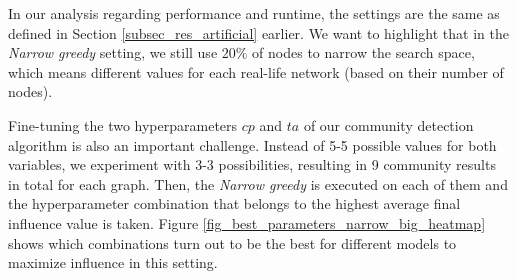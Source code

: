 \documentclass[pdflatex,sn-mathphys-num]{sn-jnl}
\begin{document}
In our analysis regarding performance and runtime, the settings are the same as defined in Section \ref{subsec_res_artificial} earlier. We want to highlight that in the \textit{Narrow greedy} setting, we still use $20\%$ of nodes to narrow the search space, which means different values for each real-life network (based on their number of nodes).

Fine-tuning the two hyperparameters $cp$ and $ta$ of our community detection algorithm is also an important challenge. Instead of 5-5 possible values for both variables, we experiment with 3-3 possibilities, resulting in 9 community results in total for each graph. Then, the \textit{Narrow greedy} is executed on each of them and the hyperparameter combination that belongs to the highest average final influence value is taken. Figure \ref{fig_best_parameters_narrow_big_heatmap} shows which combinations turn out to be the best for different models to maximize influence in this setting.
\end{document}

